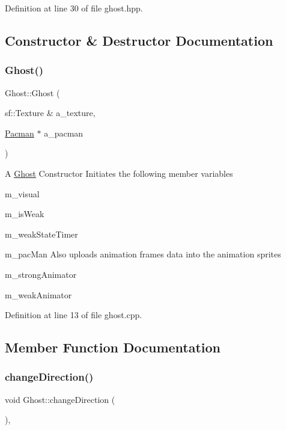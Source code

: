Definition at line 30 of file ghost.\+hpp.



\subsection{Constructor \& Destructor Documentation}
\mbox{\label{class_ghost_a931627708b35e6f0b6f9d106adbaee1f}} 
\subsubsection{\texorpdfstring{Ghost()}{Ghost()}}
{\footnotesize\ttfamily Ghost\+::\+Ghost (\begin{DoxyParamCaption}\item[{sf\+::\+Texture \&}]{a\+\_\+texture,  }\item[{\hyperlink{class_pacman}{Pacman} $\ast$}]{a\+\_\+pacman }\end{DoxyParamCaption})}

A \hyperlink{class_ghost}{Ghost} Constructor Initiates the following member variables
\begin{DoxyItemize}
\item m\+\_\+visual
\item m\+\_\+is\+Weak
\item m\+\_\+weak\+State\+Timer
\item m\+\_\+pac\+Man Also uploads animation frames data into the animation sprites
\item m\+\_\+strong\+Animator
\item m\+\_\+weak\+Animator 
\end{DoxyItemize}

Definition at line 13 of file ghost.\+cpp.



\subsection{Member Function Documentation}
\mbox{\label{class_ghost_a08831fa01afa61f91365ce82cf33bf1b}} 
\subsubsection{\texorpdfstring{change\+Direction()}{changeDirection()}}
{\footnotesize\ttfamily void Ghost\+::change\+Direction (\begin{DoxyParamCaption}{ }\end{DoxyParamCaption})\hspace{0.3cm}{\ttfamily [protected]}, {\ttfamily [virtual]}}

